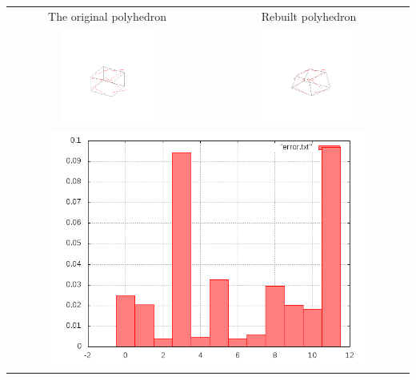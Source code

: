\documentclass[11pt,fleqn,a4paper]{scrartcl}
\begin{document}
\begin{center}

\begin{tabular}{|c|c|}
\hline
The original polyhedron& Rebuilt polyhedron \\
\includegraphics[width=0.5\textwidth]{variant2/images/23/input.png} &
\includegraphics[width=0.5\textwidth]{variant2/images/23/out.png} \\
\midrule
\multicolumn{2}{|c|}{ \includegraphics[width=0.8\textwidth]{variant2/images/23/error.png}} \\
\hline
\end{tabular}
\end{center}
\end{document}
